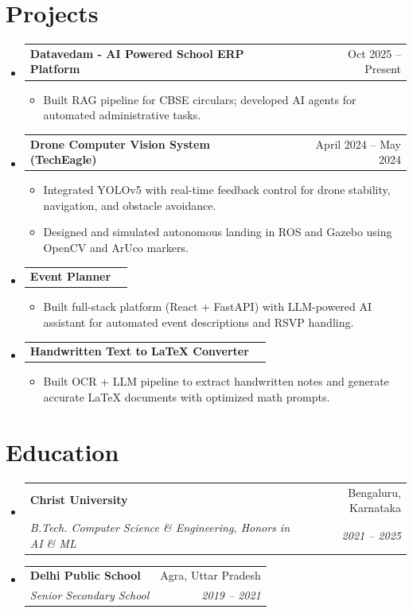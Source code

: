\documentclass[letterpaper,10pt]{article}
\makeatletter
\newcommand{\resumeItem}[1]{
  \item\small{
    {#1 \vspace{-1pt}}
  }
}
\newcommand{\resumeSubheading}[4]{
  \vspace{-1pt}\item
    \begin{tabular*}{0.97\textwidth}[t]{l@{\extracolsep{\fill}}r}
      \textbf{#1} & #2 \\
      \textit{\small #3} & \textit{\small #4} \\
    \end{tabular*}\vspace{-5pt}
}
\newcommand{\resumeProjectHeading}[2]{
    \item
    \begin{tabular*}{0.97\textwidth}{l@{\extracolsep{\fill}}r}
      \small#1 & #2 \\
    \end{tabular*}\vspace{-1pt}
}
\newcommand{\resumeSubHeadingListStart}{\begin{itemize}[leftmargin=0.15in, label={}]}
\newcommand{\resumeSubHeadingListEnd}{\end{itemize}\vspace{-5pt}}
\newcommand{\resumeItemListStart}{\begin{itemize}\vspace{-3pt}}
\newcommand{\resumeItemListEnd}{\end{itemize}\vspace{-2pt}}
\makeatother
\begin{document}
\section{Projects}
\resumeSubHeadingListStart
    \resumeProjectHeading
      {\textbf{Datavedam - AI Powered School ERP Platform}}{Oct 2025 -- Present}
      \resumeItemListStart
        \resumeItem{Built RAG pipeline for CBSE circulars; developed AI agents for automated administrative tasks.}
      \resumeItemListEnd
    \resumeProjectHeading
      {\textbf{Drone Computer Vision System (TechEagle)}}{April 2024 -- May 2024}
      \resumeItemListStart
        \resumeItem{Integrated YOLOv5 with real-time feedback control for drone stability, navigation, and obstacle avoidance.}
        \resumeItem{Designed and simulated autonomous landing in ROS and Gazebo using OpenCV and ArUco markers.}
      \resumeItemListEnd
    \resumeProjectHeading
      {\textbf{Event Planner}}{}
      \resumeItemListStart
        \resumeItem{Built full-stack platform (React + FastAPI) with LLM-powered AI assistant for automated event descriptions and RSVP handling.}
      \resumeItemListEnd
    \resumeProjectHeading
      {\textbf{Handwritten Text to LaTeX Converter}}{}
      \resumeItemListStart
        \resumeItem{Built OCR + LLM pipeline to extract handwritten notes and generate accurate LaTeX documents with optimized math prompts.}
      \resumeItemListEnd
\resumeSubHeadingListEnd

\section{Education}
\resumeSubHeadingListStart
    \resumeSubheading
      {Christ University}{Bengaluru, Karnataka}
      {B.Tech. Computer Science \& Engineering, Honors in AI \& ML}{2021 -- 2025}
    \resumeSubheading
      {Delhi Public School}{Agra, Uttar Pradesh}
      {Senior Secondary School}{2019 -- 2021}
\resumeSubHeadingListEnd
\end{document}
